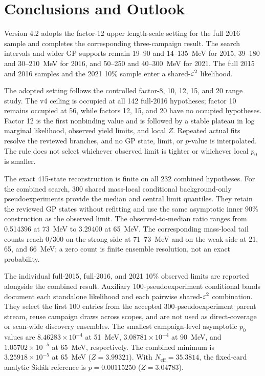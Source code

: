 \section{Conclusions and Outlook}
\label{sec:conclusions}

Version 4.2 adopts the factor-12 upper length-scale setting for the full 2016
sample and completes the corresponding three-campaign result. The search
intervals and wider GP supports remain 19--90 and 14--135~MeV for 2015, 39--180
and 30--210~MeV for 2016, and 50--250 and 40--300~MeV for 2021. The full 2015
and 2016 samples and the 2021 10\% sample enter a shared-$\varepsilon^2$ likelihood.

The adopted setting follows the controlled factor-8, 10, 12, 15, and 20 range
study. The v4 ceiling is occupied at all 142 full-2016 hypotheses; factor 10
remains occupied at 56, while factors 12, 15, and 20 have no occupied
hypotheses. Factor 12 is the first nonbinding value and is followed by a stable
plateau in log marginal likelihood, observed yield limits, and local $Z$.
Repeated actual fits resolve the reviewed branches, and no GP state, limit, or
$p$-value is interpolated. The rule does not select whichever observed limit is
tighter or whichever local $p_0$ is smaller.

The exact 415-state reconstruction is finite on all 232 combined hypotheses.
For the combined search, 300 shared mass-local conditional background-only
pseudoexperiments provide the median and central limit quantiles. They retain the
reviewed GP states without refitting and use the same asymptotic inner 90\%
\CLs{} construction as the observed limit. The observed-to-median ratio ranges
from 0.514396 at 73~MeV to 3.29400 at 65~MeV. The corresponding mass-local tail
counts reach $0/300$ on the strong side at 71--73~MeV and on the weak side at
21, 65, and 66~MeV; a zero count is finite ensemble resolution, not an exact
probability.

The individual full-2015, full-2016, and 2021 10\% observed limits are reported
alongside the combined result. Auxiliary 100-pseudoexperiment conditional bands
document each standalone likelihood and each pairwise shared-$\varepsilon^2$
combination. They select the first 100 entries from the accepted
300-pseudoexperiment parent stream, reuse campaign draws across scopes, and are
not used as direct-coverage or scan-wide discovery ensembles. The smallest
campaign-level asymptotic $p_0$ values are
$8.46283\times10^{-4}$ at 51~MeV, $3.08781\times10^{-4}$ at 90~MeV, and
$1.05702\times10^{-5}$ at 65~MeV, respectively. The combined minimum is
$3.25918\times10^{-5}$ at 65~MeV ($Z=3.99321$). With
$N_{\mathrm{eff}}=35.3814$, the fixed-card analytic \v{S}id\'ak reference is
$p=0.00115250$ ($Z=3.04783$).

